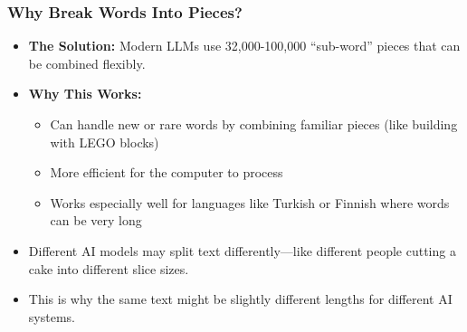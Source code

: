 \documentclass{beamer}
\begin{document}
\begin{frame}
    \frametitle{Why Break Words Into Pieces?}
    \begin{itemize}
        \item \textbf{The Solution:} Modern LLMs use 32,000-100,000 ``sub-word'' pieces that can be combined flexibly.
        \item \textbf{Why This Works:}
        \begin{itemize}
            \item Can handle new or rare words by combining familiar pieces (like building with LEGO blocks)
            \item More efficient for the computer to process
            \item Works especially well for languages like Turkish or Finnish where words can be very long
        \end{itemize}
        \item Different AI models may split text differently—like different people cutting a cake into different slice sizes.
        \item This is why the same text might be slightly different lengths for different AI systems.
    \end{itemize}
\end{frame}
\end{document}
